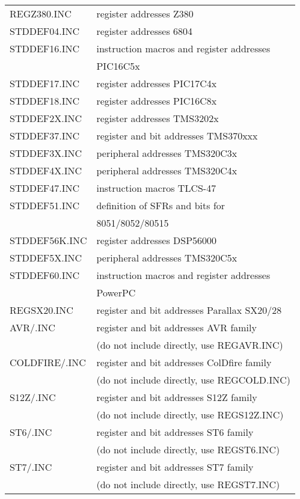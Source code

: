 \documentclass[12pt,twoside]{report}
\begin{document}
\begin{center}
\begin{longtable}{|l|l|}
REGZ380.INC       & register addresses Z380 \\
STDDEF04.INC      & register addresses 6804 \\
STDDEF16.INC      & instruction macros and register addresses \\
                  & PIC16C5x \\
STDDEF17.INC      & register addresses PIC17C4x \\
STDDEF18.INC      & register addresses PIC16C8x \\
STDDEF2X.INC      & register addresses TMS3202x \\
STDDEF37.INC      & register and bit addresses TMS370xxx \\
STDDEF3X.INC      & peripheral addresses TMS320C3x \\
STDDEF4X.INC      & peripheral addresses TMS320C4x \\
STDDEF47.INC      & instruction macros TLCS-47 \\
STDDEF51.INC      & definition of SFRs and bits for \\
                  & 8051/8052/80515 \\
STDDEF56K.INC     & register addresses DSP56000 \\
STDDEF5X.INC      & peripheral addresses TMS320C5x \\
STDDEF60.INC      & instruction macros and register addresses \\
                  & PowerPC \\
REGSX20.INC       & register and bit addresses Parallax SX20/28 \\
AVR/\*.INC        & register and bit addresses AVR family \\
                  & (do not include directly, use REGAVR.INC) \\
COLDFIRE/\*.INC   & register and bit addresses ColDfire family \\
                  & (do not include directly, use REGCOLD.INC) \\
S12Z/\*.INC       & register and bit addresses S12Z family \\
                  & (do not include directly, use REGS12Z.INC) \\
ST6/\*.INC        & register and bit addresses ST6 family \\
                  & (do not include directly, use REGST6.INC) \\
ST7/\*.INC        & register and bit addresses ST7 family \\
                  & (do not include directly, use REGST7.INC) \\

\end{longtable}
\end{center}
\end{document}
